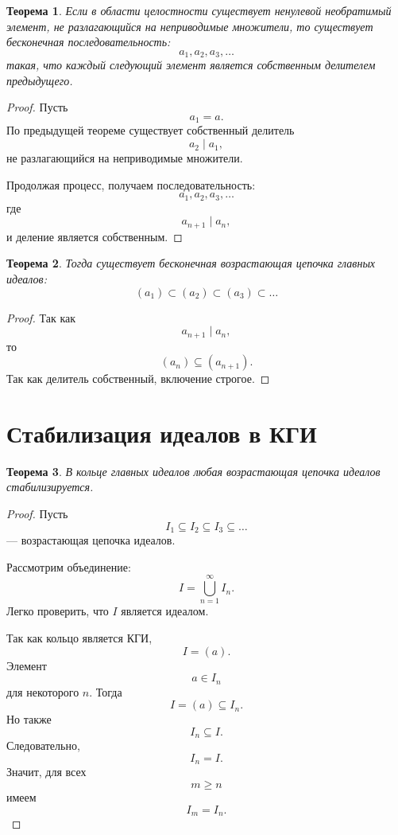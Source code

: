 \documentclass[12pt, a4paper]{article}
\newtheorem{theorem}{Теорема}
\theoremstyle{definition}
\theoremstyle{remark}
\begin{document}
\begin{theorem}
	Если в области целостности существует ненулевой необратимый элемент,
	не разлагающийся на неприводимые множители, то существует бесконечная
	последовательность:
	\[
	a_1,a_2,a_3,\dots
	\]
	такая, что каждый следующий элемент является собственным делителем
	предыдущего.
\end{theorem}

\begin{proof}
	Пусть
	\[
	a_1=a.
	\]
	По предыдущей теореме существует собственный делитель
	\[
	a_2\mid a_1,
	\]
	не разлагающийся на неприводимые множители.
	
	Продолжая процесс, получаем последовательность:
	\[
	a_1,a_2,a_3,\dots
	\]
	где
	\[
	a_{n+1}\mid a_n,
	\]
	и деление является собственным.
\end{proof}

\begin{theorem}
	Тогда существует бесконечная возрастающая цепочка главных идеалов:
	\[
	(a_1)\subset (a_2)\subset (a_3)\subset\dots
	\]
\end{theorem}

\begin{proof}
	Так как
	\[
	a_{n+1}\mid a_n,
	\]
	то
	\[
	(a_n)\subseteq(a_{n+1}).
	\]
	Так как делитель собственный, включение строгое.
\end{proof}

\section{Стабилизация идеалов в КГИ}

\begin{theorem}
	В кольце главных идеалов любая возрастающая цепочка идеалов стабилизируется.
\end{theorem}

\begin{proof}
	Пусть
	\[
	I_1\subseteq I_2\subseteq I_3\subseteq\dots
	\]
	--- возрастающая цепочка идеалов.
	
	Рассмотрим объединение:
	\[
	I=\bigcup_{n=1}^{\infty} I_n.
	\]
	Легко проверить, что $I$ является идеалом.
	
	Так как кольцо является КГИ,
	\[
	I=(a).
	\]
	Элемент
	\[
	a\in I_n
	\]
	для некоторого $n$. Тогда
	\[
	I=(a)\subseteq I_n.
	\]
	Но также
	\[
	I_n\subseteq I.
	\]
	Следовательно,
	\[
	I_n=I.
	\]
	Значит, для всех
	\[
	m\ge n
	\]
	имеем
	\[
	I_m=I_n.
	\]
\end{proof}
\end{document}
